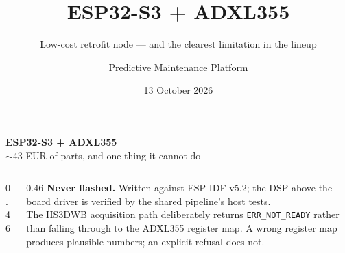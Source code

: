 \documentclass[aspectratio=169,10pt]{beamer}
\title[ESP32-S3 node]{ESP32-S3 + ADXL355}
\subtitle{Low-cost retrofit node --- and the clearest limitation in the lineup}
\author{Predictive Maintenance Platform}
\date{13 October 2026}
\begin{document}
\begin{frame}[plain]
  \vspace{5mm}
  {\LARGE\bfseries ESP32-S3 + ADXL355}\\[2mm]
  {\large\color{pdmink2} $\sim$43 EUR of parts, and one thing it cannot do}\par
  \vspace{5mm}\noindent{\color{pdmrule}\rule{\linewidth}{0.4pt}}\par
  \vspace{3mm}
  \begin{columns}[T]
    \begin{column}{0.46\textwidth}
      \scriptsize
      \\[1mm]
      \\[1mm]
      \\[1mm]
      \\[1mm]
      \\[1mm]
    \end{column}
    \begin{column}{0.46\textwidth}
      \scriptsize\color{pdmink2}
      \textbf{Never flashed.} Written against ESP-IDF v5.2; the DSP above the
      board driver is verified by the shared pipeline's host tests.
      \\[2mm]
      The IIS3DWB acquisition path deliberately returns
      \texttt{ERR\_NOT\_READY} rather than falling through to the ADXL355
      register map. A wrong register map produces plausible numbers; an explicit
      refusal does not.
    \end{column}
  \end{columns}
\end{frame}
\end{document}
